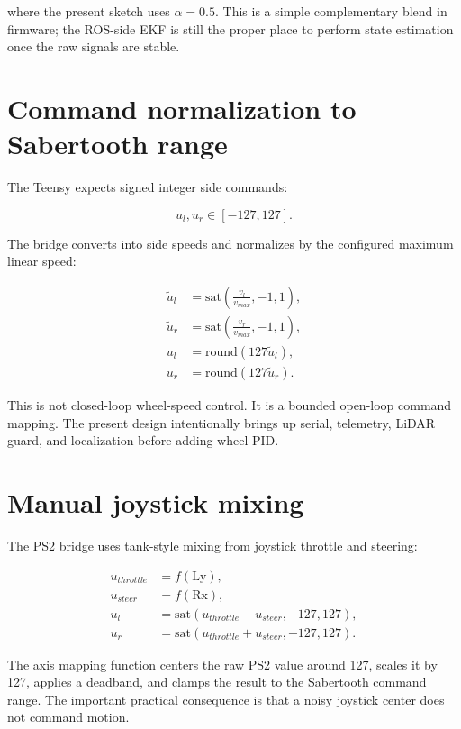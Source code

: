 where the present sketch uses \(\alpha=0.5\). This is a simple complementary blend in firmware; the ROS-side EKF is still the proper place to perform state estimation once the raw signals are stable.

\section{Command normalization to Sabertooth range}

The Teensy expects signed integer side commands:

\begin{equation}
u_l,u_r \in [-127,127].
\end{equation}

The  bridge converts  into side speeds and normalizes by the configured maximum linear speed:

\begin{align}
\tilde{u}_l &= \mathrm{sat}\left(\frac{v_l}{v_{max}},-1,1\right),\\
\tilde{u}_r &= \mathrm{sat}\left(\frac{v_r}{v_{max}},-1,1\right),\\
u_l &= \mathrm{round}(127\tilde{u}_l),\\
u_r &= \mathrm{round}(127\tilde{u}_r).
\end{align}

This is not closed-loop wheel-speed control. It is a bounded open-loop command mapping. The present design intentionally brings up serial, telemetry, LiDAR guard, and localization before adding wheel PID.

\section{Manual joystick mixing}

The PS2 bridge uses tank-style mixing from joystick throttle and steering:

\begin{align}
u_{throttle} &= f(\text{Ly}),\\
u_{steer} &= f(\text{Rx}),\\
u_l &= \mathrm{sat}(u_{throttle}-u_{steer}, -127, 127),\\
u_r &= \mathrm{sat}(u_{throttle}+u_{steer}, -127, 127).
\end{align}

The axis mapping function centers the raw PS2 value around 127, scales it by 127, applies a deadband, and clamps the result to the Sabertooth command range. The important practical consequence is that a noisy joystick center does not command motion.

